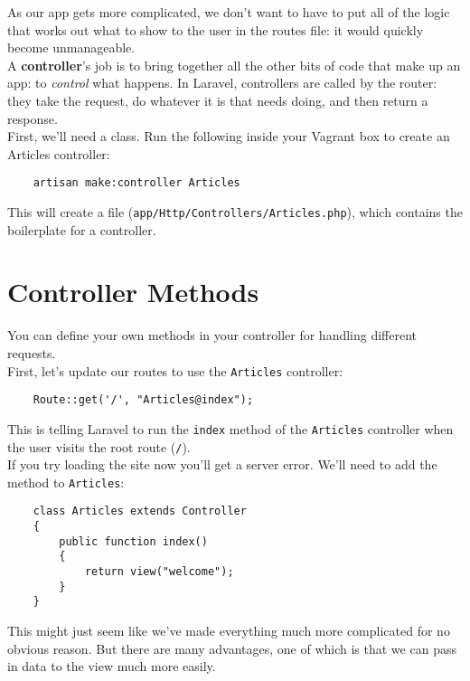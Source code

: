 As our app gets more complicated, we don't want to have to put all of the logic that works out what to show to the user in the routes file: it would quickly become unmanageable.
\\

A \textbf{controller}'s job is to bring together all the other bits of code that make up an app: to \textit{control} what happens. In Laravel, controllers are called by the router: they take the request, do whatever it is that needs doing, and then return a response.
\\

First, we'll need a class. Run the following inside your Vagrant box to create an Articles controller:

\begin{verbatim}
    artisan make:controller Articles
\end{verbatim}

This will create a file (\texttt{app/Http/Controllers/Articles.php}), which contains the boilerplate for a controller.

\section{Controller Methods}

You can define your own methods in your controller for handling different requests.
\\

First, let's update our routes to use the \texttt{Articles} controller:

\begin{verbatim}
    Route::get('/', "Articles@index");
\end{verbatim}

This is telling Laravel to run the \texttt{index} method of the \texttt{Articles} controller when the user visits the root route (\texttt{/}).
\\

If you try loading the site now you'll get a server error. We'll need to add the method to \texttt{Articles}:

\begin{verbatim}
    class Articles extends Controller
    {
        public function index()
        {
            return view("welcome");
        }
    }
\end{verbatim}

This might just seem like we've made everything much more complicated for no obvious reason. But there are many advantages, one of which is that we can pass in data to the view much more easily.
\\

